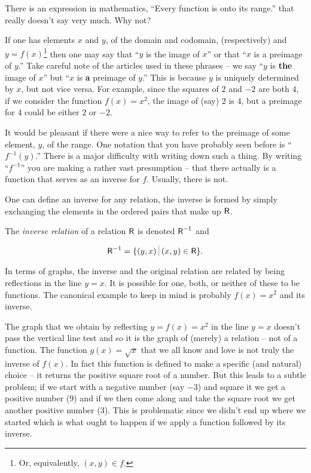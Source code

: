 \begin{exer}
There is an expression in mathematics, ``Every function is onto its %
range.'' that really doesn't say very much.  Why not?
\end{exer}

If one has elements $x$ and $y$, of the domain and codomain, (respectively)
and $y = f(x)$\footnote{Or, equivalently, $(x,y) \in f$.} then one may 
say that ``$y$ is the image of $x$'' or that
``$x$ is a preimage of $y$.''  Take careful note of the articles used in
these phrases -- we say  ``$y$ is {\bf the} image of $x$'' but 
``$x$ is {\bf a} preimage of $y$.''  This is because $y$ is uniquely determined
by $x$, but not vice versa.  For example, since the squares of $2$ and $-2$ are
both $4$, if we consider the function $f(x) = x^2$, the image of (say) $2$ 
is $4$, but a preimage for $4$ could be either $2$ or $-2$.

It would be pleasant if there were a nice way to refer to the preimage of
some element, $y$, of the range.  One notation that you have probably 
seen before is ``$f^{-1}(y)$.''  There is a major difficulty with writing 
down such a thing.  By writing ``$f^{-1}$'' you are making a rather
vast presumption -- that there actually is a function that serves as an
inverse for $f$.  Usually, there is not.  

One can define an inverse for any relation, the inverse is formed by
simply exchanging the elements in the ordered pairs that make up $\mbox{\textsf R}$.

\begin{defi}
The \emph{inverse relation} of a relation $\mbox{\textsf R}$
is denoted $\mbox{\textsf R}^{-1}$ and 

\[ \relR^{-1} = \{ (y,x) \suchthat (x,y) \in \relR \}. \]
\end{defi}

In terms of graphs, the inverse and the original relation are related
by being reflections in the line $y=x$.  It is possible for one, both,
or neither of these to be functions.  The canonical example to keep
in mind is probably $f(x) = x^2$ and its inverse.

\begin{center}

\end{center}

The graph that we obtain by reflecting $y=f(x)=x^2$ in the line $y=x$ doesn't
pass the vertical line test and so it is the graph of (merely) a relation 
-- not of a function.  The function $g(x) = \sqrt{x}$ that we all know 
and love is not truly the inverse of $f(x)$.  In fact this function is
defined to make a specific (and natural) choice -- it returns the positive
square root of a number.  But this leads to a subtle problem; if we start
with a negative number (say $-3$) and square it we get a positive number ($9$)
and if we then come along and take the square root we get another positive
number ($3$).  This is problematic since we didn't end up where we started
which is what ought to happen if we apply a function followed by its inverse.

